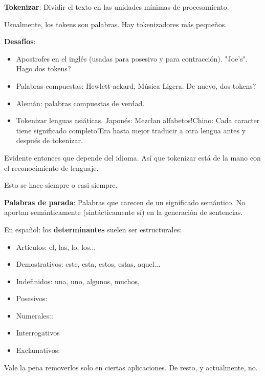 \documentclass{fmbnotes}
\begin{document}
\label{sec:1_tokenizar}
\textbf{Tokenizar}: Dividir el texto en las unidades mínimas de procesamiento.

Usualmente, los tokens son palabras. Hay tokenizadores más pequeños.

\textbf{Desafíos}:


\begin{itemize}
    \item Apostrofes en el inglés (usadas para posesivo y para contracción). "Joe's". Hago dos tokens?
    \item Palabras compuestas: Hewlett-ackard, Música Ligera. De nuevo, dos tokens?
    \item Alemán: palabras compuestas de verdad.
    \item Tokenizar lenguas asiáticas. Japonés: Mezclan alfabetos!Chino: Cada caracter tiene significado completo!Era hasta mejor traducir a otra lengua antes y después de tokenizar.
\end{itemize}

Evidente entonces que depende del idioma. Así que tokenizar está de la mano con el reconocimiento de lenguaje.

Esto se hace siempre o casi siempre.

\label{sec:1_5_opcional_eliminacion_de_palabras_de_parada}

\textbf{Palabras de parada}: Palabras que carecen de un significado semántico.
No aportan semánticamente (sintácticamente sí) en la generación de sentencias.

En español: los \textbf{determinantes} suelen ser estructurales:

\begin{itemize}
    \item Artículos: el, las, lo, los...
    \item Demostrativos: este, esta, estos, estas, aquel...
    \item Indefinidos: una, uno, algunos, muchos,
    \item Posesivos:
    \item Numerales::
    \item Interrogativos
    \item Exclamativos:
\end{itemize}
Vale la pena removerlos solo en ciertas aplicaciones. De resto, y actualmente, no.

\label{sec:2_normalizar}
\end{document}

